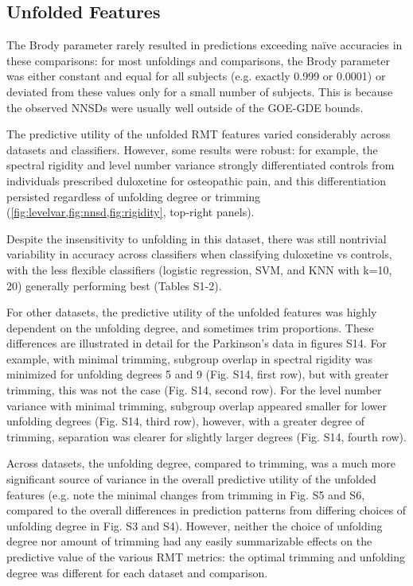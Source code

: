 \documentclass[10pt]{article}
\begin{document}
\subsection{Unfolded Features}
The Brody parameter rarely resulted in predictions exceeding naïve accuracies in these comparisons:
for most unfoldings and comparisons, the Brody parameter was either constant and equal for all
subjects (e.g. exactly 0.999 or 0.0001) or deviated from these values only for a small number of
subjects. This is because the observed NNSDs were usually well outside of the GOE-GDE bounds.

The predictive utility of the unfolded RMT features varied considerably across datasets and
classifiers. However, some results were robust: for example, the spectral rigidity and level number
variance strongly differentiated controls from individuals prescribed duloxetine for osteopathic
pain, and this differentiation persisted regardless of unfolding degree or trimming
(\cref{fig:levelvar,fig:nnsd,fig:rigidity}, top-right panels).

Despite the insensitivity to unfolding in this dataset, there was still nontrivial variability in
accuracy across classifiers when classifying duloxetine vs controls, with the less flexible
classifiers (logistic regression, SVM, and KNN with k=10, 20) generally performing best (Tables
S1-2).

For other datasets, the predictive utility of the unfolded features was highly dependent on the
unfolding degree, and sometimes trim proportions. These differences are illustrated in detail for
the Parkinson's data in figures S14. For example, with minimal trimming, subgroup overlap in spectral
rigidity was minimized for unfolding degrees 5 and 9 (Fig. S14, first row), but with greater
trimming, this was not the case (Fig. S14, second row). For the level number variance with minimal
trimming, subgroup overlap appeared smaller for lower unfolding degrees (Fig. S14, third row),
however, with a greater degree of trimming, separation was clearer for slightly larger degrees (Fig.
S14, fourth row).

Across datasets, the unfolding degree, compared to trimming, was a much more significant source of
variance in the overall predictive utility of the unfolded features (e.g. note the minimal changes
from trimming in Fig. S5 and S6, compared to the overall differences in prediction patterns from
differing choices of unfolding degree in Fig. S3 and S4). However, neither the choice of unfolding
degree nor amount of trimming had any easily summarizable effects on the predictive value of the
various RMT metrics: the optimal trimming and unfolding degree was different for each dataset and
comparison.
\end{document}
